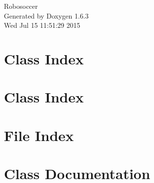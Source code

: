 \documentclass[a4paper]{book}
\begin{document}
\hypersetup{pageanchor=false}
\begin{titlepage}
\vspace*{7cm}
\begin{center}
{\Large Robosoccer }\\
\vspace*{1cm}
{\large Generated by Doxygen 1.6.3}\\
\vspace*{0.5cm}
{\small Wed Jul 15 11:51:29 2015}\\
\end{center}
\end{titlepage}
\clearemptydoublepage
{}
\tableofcontents
\clearemptydoublepage
{}
\hypersetup{pageanchor=true}
\chapter{Class Index}

\chapter{Class Index}

\chapter{File Index}

\chapter{Class Documentation}































\end{document}
